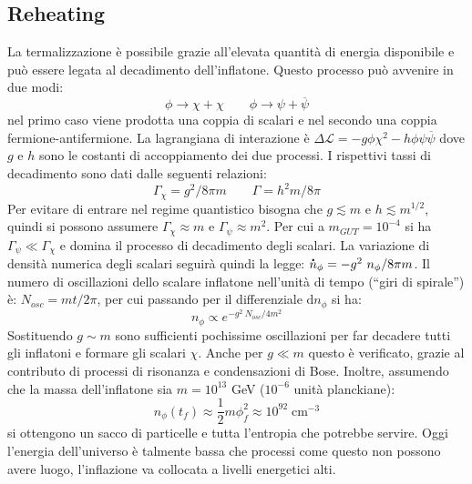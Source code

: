 \subsection{Reheating}
La termalizzazione è possibile grazie all'elevata quantità di energia disponibile e può essere legata al decadimento dell'inflatone. Questo processo può avvenire in due modi:
$$
\phi \rightarrow \chi + \chi \qquad \phi \rightarrow \psi + {\overbar{\psi}}
$$
nel primo caso viene prodotta una coppia di scalari e nel secondo una coppia fermione-antifermione. La lagrangiana di interazione è $\Delta \mathcal{L} = -g \phi \chi^2 - h \phi \psi {\overbar{\psi}}$ dove $g$ e $h$ sono le costanti di accoppiamento dei due processi. I rispettivi tassi di decadimento sono dati dalle seguenti relazioni:
$$
\Gamma_\chi = g^2 / 8\pi m \qquad \Gamma =h^2 m / 8\pi 
$$
Per evitare di entrare nel regime quantistico bisogna che $g \lesssim m$ e $h\lesssim m^{1/2}$, quindi si possono assumere $\Gamma_\chi \approx m$ e $\Gamma_\psi \approx m^2$. Per cui a $m_{GUT}=10^{-4}$ si ha $\Gamma_\psi \ll \Gamma_\chi$ e domina il processo di decadimento degli scalari. La variazione di densità numerica degli scalari seguirà quindi la legge: $\accentset{\mbox{\large\bfseries .}}{n}_\phi = - g^2 ~n_\phi / 8\pi m$. Il numero di oscillazioni dello scalare inflatone nell'unità di tempo (``giri di spirale'') è: $N_{osc}=mt/2\pi$, per cui passando per il differenziale $\mathrm{d}n_\phi$ si ha:
\begin{equation}
    n_\phi \propto e^{-g^2 ~N_{osc}/4m^2}
\end{equation}
Sostituendo $g \sim m$ sono sufficienti pochissime oscillazioni per far decadere tutti gli inflatoni e formare gli scalari $\chi$. Anche per $g \ll m$ questo è verificato, grazie al contributo di processi di risonanza e condensazioni di Bose. Inoltre, assumendo che la massa dell'inflatone sia $m=10^{13}$ GeV ($10^{-6}$ unità planckiane):
\begin{equation}
    n_\phi (t_f)\approx \frac{1}{2}m\phi_f^2 \approx 10^{92}\; \mathrm{cm^{-3}}
\end{equation}
si ottengono un sacco di particelle e tutta l'entropia che potrebbe servire. Oggi l'energia dell'universo è talmente bassa che processi come questo non possono avere luogo, l'inflazione va collocata a livelli energetici alti.

